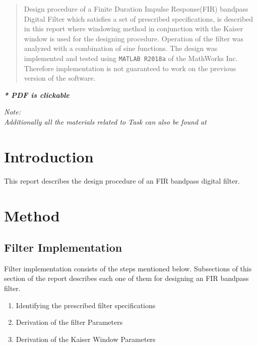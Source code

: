 \documentclass[a4paper,11pt]{article}%
\begin{document}


\begin{abstract}
	Design procedure of a Finite Duration Impulse Response(FIR) bandpass Digital Filter which satisfies a set of prescribed specifications, is described in this report where windowing method in conjunction with the Kaiser window is used for the designing procedure. Operation of the filter was analyzed with a combination of sine functions. The design was implemented and tested using {\tt MATLAB R2018a} of the MathWorks Inc. Therefore implementation is not guaranteed to work on the previous version of the software.	
\end{abstract}

\pagebreak
\tableofcontents

\begin{center}
	\textbf{\textit{* PDF is clickable}}
\end{center}



\textit{Note:}\\
\textit{Additionally all the materials related to Task can also be found at \url{}}
\pagebreak

\section{Introduction}

This report describes the design procedure of an FIR bandpass digital filter.

\section{Method}

\subsection{Filter Implementation}
Filter implementation consists of the steps mentioned below. Subsections of this section of the report describes each one of them for designing an FIR bandpass filter.

\begin{enumerate}[\hspace{1cm}1.]
	\item Identifying the prescribed filter specifications
	\item Derivation of the filter Parameters
	\item Derivation of the Kaiser Window Parameters
\end{enumerate}
\pagebreak
\end{document}
